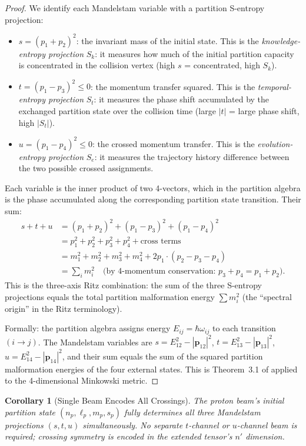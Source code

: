 \documentclass[twocolumn,10pt,a4paper]{article}
\theoremstyle{thmstyle}
\newtheorem{corollary}[theorem]{Corollary}
\theoremstyle{definition}
\theoremstyle{remark}
\newcommand{\Sk}{S_{k}}
\newcommand{\St}{S_{t}}
\newcommand{\Se}{S_{e}}
\begin{document}
\begin{proof}
We identify each Mandelstam variable with a partition S-entropy projection:
\begin{itemize}[nosep]
\item $s = (p_1 + p_2)^2$: the invariant mass of the initial state.
  This is the \emph{knowledge-entropy projection} $\Sk$: it measures
  how much of the initial partition capacity is concentrated in the
  collision vertex (high $s$ = concentrated, high $\Sk$).
\item $t = (p_1 - p_3)^2 \leq 0$: the momentum transfer squared.
  This is the \emph{temporal-entropy projection} $\St$: it measures
  the phase shift accumulated by the exchanged partition state over
  the collision time (large $|t|$ = large phase shift, high $|\St|$).
\item $u = (p_1 - p_4)^2 \leq 0$: the crossed momentum transfer.
  This is the \emph{evolution-entropy projection} $\Se$: it measures
  the trajectory history difference between the two possible crossed
  assignments.
\end{itemize}
Each variable is the inner product of two 4-vectors, which in the
partition algebra is the phase accumulated along the corresponding
partition state transition.  Their sum:
\begin{align}
s + t + u &= (p_1+p_2)^2 + (p_1-p_3)^2 + (p_1-p_4)^2 \nonumber\\
&= p_1^2 + p_2^2 + p_3^2 + p_4^2 + \text{cross terms} \nonumber\\
&= m_1^2 + m_2^2 + m_3^2 + m_4^2 + 2p_1\cdot(p_2-p_3-p_4) \nonumber\\
&= \sum_i m_i^2 \quad \text{(by 4-momentum conservation: $p_3+p_4=p_1+p_2$)}.
\end{align}
This is the three-axis Ritz combination: the sum of the three
S-entropy projections equals the total partition malformation
energy $\sum m_i^2$ (the ``spectral origin'' in the Ritz terminology).

Formally: the partition algebra assigns energy $E_{ij} = \hbar\omega_{ij}$
to each transition $(i \to j)$.  The Mandelstam variables are
$s = E_{12}^2 - |\mathbf{p}_{12}|^2$,
$t = E_{13}^2 - |\mathbf{p}_{13}|^2$,
$u = E_{14}^2 - |\mathbf{p}_{14}|^2$,
and their sum equals the sum of the squared partition malformation
energies of the four external states.  This is Theorem~3.1 of
\citet{companion:recursive} applied to the 4-dimensional Minkowski
metric.
\end{proof}

\begin{corollary}[Single Beam Encodes All Crossings]
\label{cor:single_beam}
The proton beam's initial partition state $(n_p, \ell_p, m_p, s_p)$ fully
determines all three Mandelstam projections $(s, t, u)$ simultaneously.
No separate $t$-channel or $u$-channel beam is required; crossing symmetry
is encoded in the extended tensor's $n'$ dimension.
\end{corollary}
\end{document}
